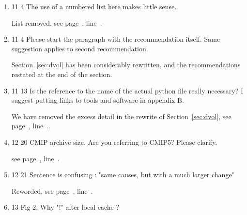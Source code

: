 \documentclass[gmd,manuscript]{copernicus}
\newcommand{\plref}[1]{see page~\pageref{p-#1}, line~\lineref{l-#1}.}
\newenvironment{answer}{\color{blue}}{}
\begin{document}
\begin{enumerate}[label=RC2-\arabic*,leftmargin=*]
  \begin{answer}
    The data volume discussion has been rewritten, see
    Section~\ref{sec:dvol}. As regards the second point, it is no
    doubt true that many of the variables exhibit considerable
    covariance, and are not statistically independent. But this
    remains still a matter for analysis and discovery. The current
    1-variable-file remains a useful unit of analysis, a compromise
    for most users between too large files and too many files. Future
    infrastructure may indeed move in other directions based on the
    outcomes of CMIP6, and indeed POSIX ``files'' may themselves
    become obsolete, under certain technological evolutionary
    pathways currently at the cutting edge. We have added some
    discussion of these issues in the Conclusion.
  \end{answer}
\item 11 4 The use of a numbered list here makes little sense.

  \begin{answer}
    List removed, \plref{RC2-21}
  \end{answer}
\item 11 4 Please start the paragraph with the recommendation itself.
  Same suggestion applies to second recommendation.

  \begin{answer}
    Section~\ref{sec:dvol} has been considerably rewritten, and the
    recommendations restated at the end of the section.
  \end{answer}
\item 11 13 Is the reference to the name of the actual python file
  really necessary? I suggest putting links to tools and software in
  appendix B.

  \begin{answer}
    We have removed the excess detail in the rewrite of
    Section~\ref{sec:dvol}, \plref{RC2-23}.
  \end{answer}
\item 12 20 CMIP archive size. Are you referring to CMIP5? Please
  clarify.

  \begin{answer}
    \plref{RC1-28}
  \end{answer}
\item 12 21 Sentence is confusing : "same causes, but with a much
  larger change"

  \begin{answer}
    Reworded, \plref{RC1-29b}
  \end{answer}
\item 13 Fig 2. Why "!" after local cache ?


\end{enumerate}
\end{document}
